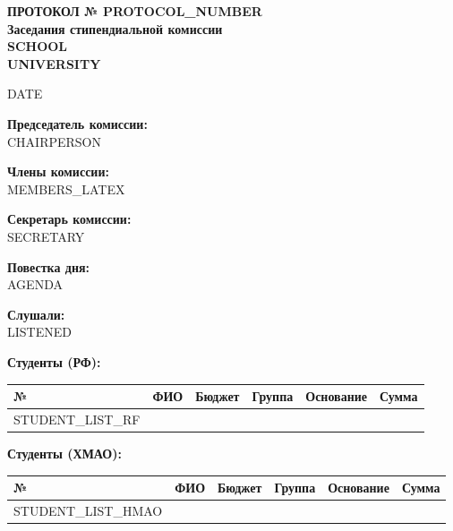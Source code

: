 \documentclass[a4paper,12pt]{article}
\begin{document}
\begin{center}
  \textbf{ПРОТОКОЛ № {PROTOCOL_NUMBER}} \\
  \vspace{0.5em}
  \textbf{Заседания стипендиальной комиссии} \\
  \vspace{0.5em}
  \textbf{{SCHOOL}} \\
  \vspace{0.5em}
  \textbf{{UNIVERSITY}} \\
\end{center}

\vspace{1em}
{{DATE}} \\
\vspace{1em}

\textbf{Председатель комиссии:} \\
{{CHAIRPERSON}} \\
\vspace{0.5em}

\textbf{Члены комиссии:} \\
{MEMBERS_LATEX} \\
\vspace{0.5em}

\textbf{Секретарь комиссии:} \\
{{SECRETARY}} \\
\vspace{0.5em}

\textbf{Повестка дня:} \\
{{AGENDA}} \\
\vspace{0.5em}

\textbf{Слушали:} \\
{{LISTENED}} \\
\vspace{1em}

\textbf{Студенты (РФ):} \\
\begin{tabular}{|C{0.5cm}|L{5cm}|C{2cm}|C{2cm}|L{5cm}|C{2cm}|}
  \hline
  \textbf{№} & \textbf{ФИО} & \textbf{Бюджет} & \textbf{Группа} & \textbf{Основание} & \textbf{Сумма} \\
  \hline
  {STUDENT_LIST_RF}
  \hline
\end{tabular}
\vspace{1em}

\textbf{Студенты (ХМАО):} \\
\begin{tabular}{|C{0.5cm}|L{5cm}|C{2cm}|C{2cm}|L{5cm}|C{2cm}|}
  \hline
  \textbf{№} & \textbf{ФИО} & \textbf{Бюджет} & \textbf{Группа} & \textbf{Основание} & \textbf{Сумма} \\
  \hline
  {STUDENT_LIST_HMAO}
  \hline
\end{tabular}
\vspace{2em}
\end{document}
